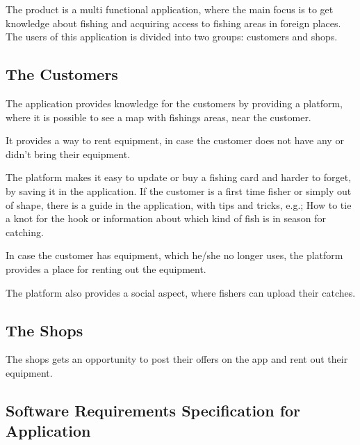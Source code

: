 The product is a multi functional application, where the main focus is to get knowledge about fishing and acquiring access to fishing areas in foreign places. 
The users of this application is divided into two groups: customers and shops. 

\subsection{The Customers}
The application provides knowledge for the customers by providing a platform, where it is possible to see a map with fishings areas, near the customer.

It provides a way to rent equipment, in case the customer does not have any or didn’t bring their equipment. 

The platform makes it easy to update or buy a fishing card and harder to forget, by saving it in the application. If the customer is a first time fisher or simply out of shape, there is a guide in the application, with tips and tricks, e.g.; How to tie a knot for the hook or information about which kind of fish is in season for catching. 

In case the customer has equipment, which he/she no longer uses, the platform provides a place for renting out the equipment.

The platform also provides a social aspect, where fishers can upload their catches. 


\subsection{The Shops}
The shops gets an opportunity to post their offers on the app and rent out their equipment.

\subsection{Software Requirements Specification for Application}

